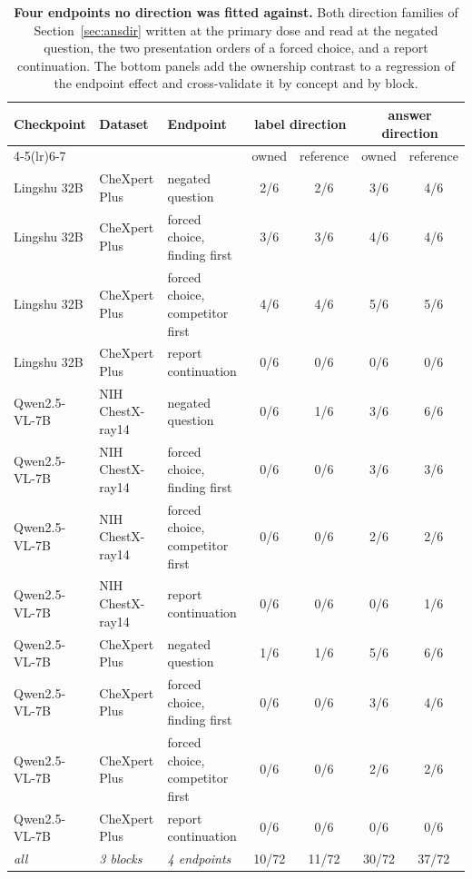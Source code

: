 \begin{table}[htbp]
\centering
\scriptsize
\setlength{\tabcolsep}{3pt}
\caption{\textbf{Four endpoints no direction was fitted against.} Both direction families of Section~\ref{sec:ansdir} written at the primary dose and read at the negated question, the two presentation orders of a forced choice, and a report continuation. The bottom panels add the ownership contrast to a regression of the endpoint effect and cross-validate it by concept and by block.}
\label{tab:cf-semend}
\begin{tabular}{lllcccc}
\toprule
\multirow{2}{*}{Checkpoint} & \multirow{2}{*}{Dataset} & \multirow{2}{*}{Endpoint} & \multicolumn{2}{c}{label direction} & \multicolumn{2}{c}{answer direction}\\
\cmidrule(lr){4-5}\cmidrule(lr){6-7}
&  &  & \multicolumn{1}{c}{owned} & \multicolumn{1}{c}{reference} & \multicolumn{1}{c}{owned} & \multicolumn{1}{c}{reference}\\
\midrule
Lingshu 32B & CheXpert Plus & negated question & 2/6 & 2/6 & 3/6 & 4/6 \\
Lingshu 32B & CheXpert Plus & forced choice, finding first & 3/6 & 3/6 & 4/6 & 4/6 \\
Lingshu 32B & CheXpert Plus & forced choice, competitor first & 4/6 & 4/6 & 5/6 & 5/6 \\
Lingshu 32B & CheXpert Plus & report continuation & 0/6 & 0/6 & 0/6 & 0/6 \\
Qwen2.5-VL-7B & NIH ChestX-ray14 & negated question & 0/6 & 1/6 & 3/6 & 6/6 \\
Qwen2.5-VL-7B & NIH ChestX-ray14 & forced choice, finding first & 0/6 & 0/6 & 3/6 & 3/6 \\
Qwen2.5-VL-7B & NIH ChestX-ray14 & forced choice, competitor first & 0/6 & 0/6 & 2/6 & 2/6 \\
Qwen2.5-VL-7B & NIH ChestX-ray14 & report continuation & 0/6 & 0/6 & 0/6 & 1/6 \\
Qwen2.5-VL-7B & CheXpert Plus & negated question & 1/6 & 1/6 & 5/6 & 6/6 \\
Qwen2.5-VL-7B & CheXpert Plus & forced choice, finding first & 0/6 & 0/6 & 3/6 & 4/6 \\
Qwen2.5-VL-7B & CheXpert Plus & forced choice, competitor first & 0/6 & 0/6 & 2/6 & 2/6 \\
Qwen2.5-VL-7B & CheXpert Plus & report continuation & 0/6 & 0/6 & 0/6 & 0/6 \\
\midrule
\textit{all} & \textit{3 blocks} & \textit{4 endpoints} & 10/72 & 11/72 & 30/72 & 37/72 \\

\end{tabular}
\end{table}
